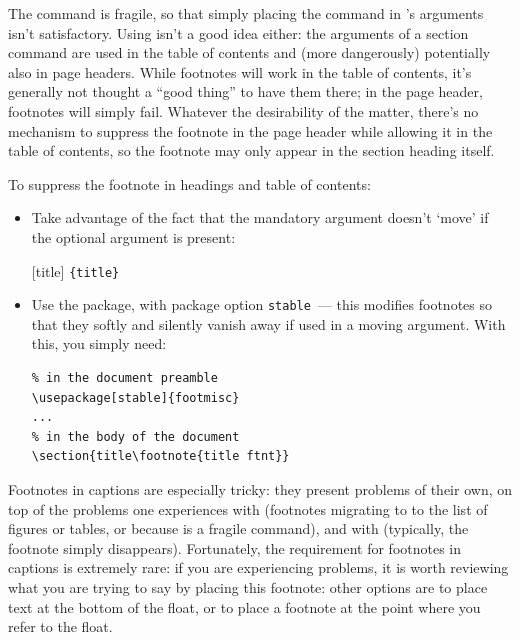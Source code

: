 
The  command is fragile, so that simply placing the
command in 's arguments isn't satisfactory.  Using
 isn't a good idea either: the arguments of a
section command are used in the table of contents and (more
dangerously) potentially also in page headers.  While footnotes will
work in the table of contents, it's generally not thought a ``good
thing'' to have them there; in the page header, footnotes will simply
fail.  Whatever the desirability of the matter, there's no mechanism
to suppress the footnote in the page header while allowing it in the table
of contents, so the footnote may only appear in the section heading itself.

To suppress the footnote in headings and table of contents:
\begin{itemize}
\item Take advantage of the fact that the mandatory argument doesn't
  `move' if the optional argument is present:

  [title]%
    \texttt{\{title}\texttt{\}}
\item Use the  package, with package option
  \texttt{stable}~--- this modifies footnotes so that they softly and
  silently vanish away if used in a moving argument.  With this, you
  simply need:
\begin{verbatim}
% in the document preamble
\usepackage[stable]{footmisc}
...
% in the body of the document
\section{title\footnote{title ftnt}}
\end{verbatim}
\end{itemize}
\begin{ctanrefs}
\item[footmisc.sty]
\end{ctanrefs}


Footnotes in captions are especially tricky: they present problems of
their own, on top of the problems one experiences with
 (footnotes migrating to
to the list of figures or tables, or %
 because
 is a fragile command), and with %
 (typically, the footnote
simply disappears).  Fortunately, the requirement for footnotes in
captions is extremely rare: if you are experiencing problems, it is
worth reviewing what you are trying to say by placing this footnote:
other options are to place text at the bottom of the float, or to
place a footnote at the point where you refer to the float.

